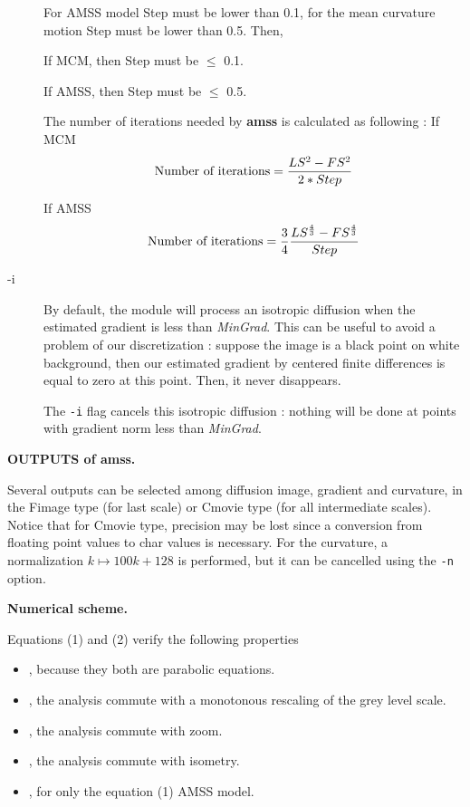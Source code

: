 \begin{description}
For AMSS model Step must be lower than 0.1, for the mean curvature motion Step must 
be lower than 0.5. Then, \par

If MCM,  then Step must be $\leq$ 0.1. 

If AMSS,  then Step must be $\leq$ 0.5.


The number of iterations needed by {\bf amss} is calculated as following :
If MCM
$$ \hbox{Number of iterations} = \frac{LS^2 - FS^2}{2*Step}$$

If AMSS
$$ \hbox{Number of iterations} =  \frac{3}{4}\frac{ LS^\frac{4}{3} - FS^\frac{4}{3}}{Step}
$$

\item[ -i]

By default, the module will process an isotropic diffusion 
when the estimated gradient is less than {\it MinGrad}. 
This can be useful to avoid a problem of our discretization :
suppose the image is a black point on white background, then our estimated
gradient by centered finite differences is equal to zero at this point. 
Then, it never disappears.

The \verb+-i+ flag cancels this isotropic diffusion : 
nothing will be done at points with gradient norm less than {\it MinGrad}.



\end{description}


{\bf OUTPUTS of amss.}

Several outputs can be selected among diffusion image, gradient and curvature,
 in the Fimage type (for last scale) or Cmovie type 
(for all intermediate scales). Notice that for Cmovie type, precision
may be lost since a conversion from floating point values to char 
values is necessary. For the curvature, a normalization $k\mapsto 100k+128$
is performed, but it can be cancelled using the \verb+-n+ option.

\vskip 3cm

{\bf \Large Numerical scheme.}

Equations (1) and (2) verify the following properties 
\begin{itemize}
\item \MONO, because they both are parabolic equations.
\item \Morp, the analysis commute with a monotonous rescaling of the grey level scale.
\item \ECHE, the analysis commute with zoom.
\item \ROTA, the analysis commute with isometry.
\item \AFFI, for only the equation (1) AMSS model.
\end{itemize}

